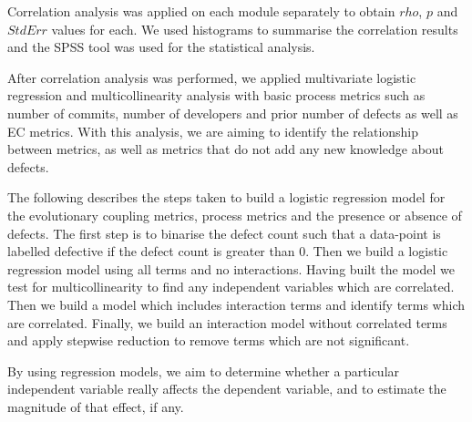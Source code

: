 \documentclass[times]{smrauth}
\begin{document}
Correlation analysis was applied on each module separately to obtain $rho$, $p$ and $StdErr$ values for each. We used histograms to summarise the correlation results and the SPSS \cite{SPSS:2013:Online} tool was used for the statistical analysis.

After correlation analysis was performed, we applied multivariate logistic regression and multicollinearity analysis with basic process metrics such as number of commits, number of developers and prior number of defects as well as EC metrics. With this analysis, we are aiming to identify the relationship between metrics, as well as metrics that do not add any new knowledge about defects.  

The following describes the steps taken to build a logistic regression model for the evolutionary coupling metrics, process metrics and the presence or absence of defects. The first step is to binarise the defect count such that a data-point is labelled defective if the defect count is greater than 0. Then we build a logistic regression model using all terms and no interactions.  Having built the model we test for multicollinearity to find any independent variables which are correlated. %
Then we build a model which includes interaction terms and identify terms which are correlated.  Finally, we build an interaction model without correlated terms and apply stepwise reduction to remove terms which are not significant.


By using regression models, we aim to determine whether a particular independent variable really affects the dependent variable, and to estimate the magnitude of that effect, if any.

\end{document}
